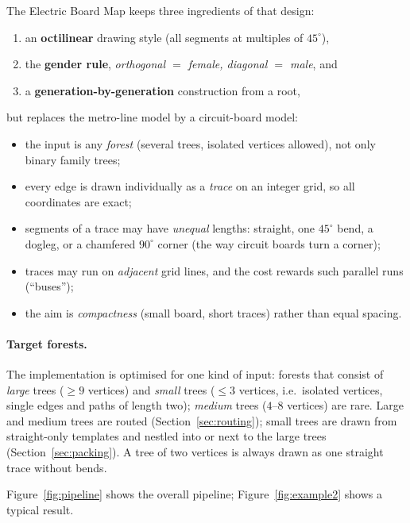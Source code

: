 \documentclass[11pt,a4paper]{article}
\theoremstyle{remark}
\begin{document}
The Electric Board Map keeps three ingredients of that design:
\begin{enumerate}[nosep]
  \item an \textbf{octilinear} drawing style (all segments at multiples of $45^\circ$),
  \item the \textbf{gender rule}, \emph{orthogonal $=$ female, diagonal $=$ male}, and
  \item a \textbf{generation-by-generation} construction from a root,
\end{enumerate}
but replaces the metro-line model by a circuit-board model:
\begin{itemize}[nosep]
  \item the input is any \emph{forest} (several trees, isolated vertices allowed), not only binary family trees;
  \item every edge is drawn individually as a \emph{trace} on an integer grid, so all coordinates are exact;
  \item segments of a trace may have \emph{unequal} lengths: straight, one $45^\circ$ bend, a dogleg, or a
        chamfered $90^\circ$ corner (the way circuit boards turn a corner);
  \item traces may run on \emph{adjacent} grid lines, and the cost rewards such parallel runs (``buses'');
  \item the aim is \emph{compactness} (small board, short traces) rather than equal spacing.
\end{itemize}

\paragraph{Target forests.} The implementation is optimised for one kind of input: forests that consist of
\emph{large} trees ($\ge 9$ vertices) and \emph{small} trees ($\le 3$ vertices, i.e.\ isolated vertices, single
edges and paths of length two); \emph{medium} trees ($4$--$8$ vertices) are rare. Large and medium trees are routed
(Section~\ref{sec:routing}); small trees are drawn from straight-only templates and nestled into or next to the large
trees (Section~\ref{sec:packing}). A tree of two vertices is always drawn as one straight trace without bends.

Figure~\ref{fig:pipeline} shows the overall pipeline; Figure~\ref{fig:example2} shows a typical result.
\end{document}
